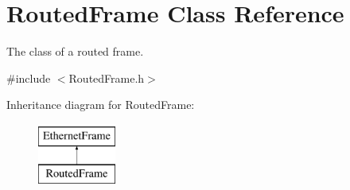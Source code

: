 \hypertarget{classRoutedFrame}{\section{Routed\-Frame Class Reference}
\label{classRoutedFrame}
}


The class of a routed frame.  




{\ttfamily \#include $<$Routed\-Frame.\-h$>$}

Inheritance diagram for Routed\-Frame\-:\begin{figure}[H]
\begin{center}
\leavevmode
\includegraphics[height=2.000000cm]{classRoutedFrame}
\end{center}
\end{figure}
